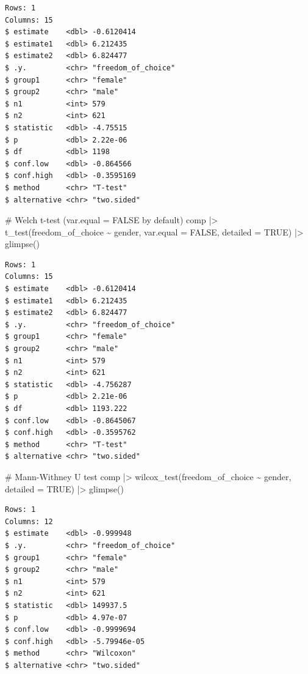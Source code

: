 \documentclass[
  letterpaper,
]{krantz}
\makeatletter
\newenvironment{Shaded}{\begin{snugshade}}{\end{snugshade}}
\newcommand{\AttributeTok}[1]{\textcolor[rgb]{0.40,0.45,0.13}{#1}}
\newcommand{\CommentTok}[1]{\textcolor[rgb]{0.37,0.37,0.37}{#1}}
\newcommand{\ConstantTok}[1]{\textcolor[rgb]{0.56,0.35,0.01}{#1}}
\newcommand{\FunctionTok}[1]{\textcolor[rgb]{0.28,0.35,0.67}{#1}}
\newcommand{\NormalTok}[1]{\textcolor[rgb]{0.00,0.23,0.31}{#1}}
\newcommand{\SpecialCharTok}[1]{\textcolor[rgb]{0.37,0.37,0.37}{#1}}
\newenvironment{kframe}{%
\medskip{}
\setlength{\fboxsep}{.8em}
 \def\at@end@of@kframe{}%
 \ifinner\ifhmode%
  \def\at@end@of@kframe{\end{minipage}}%
  \begin{minipage}{\columnwidth}%
 \fi\fi%
 \def\FrameCommand##1{\hskip\@totalleftmargin \hskip-\fboxsep
 \colorbox{shadecolor}{##1}\hskip-\fboxsep
     \hskip-\linewidth \hskip-\@totalleftmargin \hskip\columnwidth}%
 \MakeFramed {\advance\hsize-\width
   \@totalleftmargin\z@ \linewidth\hsize
   \@setminipage}}%
 {\par\unskip\endMakeFramed%
 \at@end@of@kframe}
\renewenvironment{Shaded}{\begin{kframe}}{\end{kframe}}
\makeatother
\begin{document}
\begin{verbatim}
Rows: 1
Columns: 15
$ estimate    <dbl> -0.6120414
$ estimate1   <dbl> 6.212435
$ estimate2   <dbl> 6.824477
$ .y.         <chr> "freedom_of_choice"
$ group1      <chr> "female"
$ group2      <chr> "male"
$ n1          <int> 579
$ n2          <int> 621
$ statistic   <dbl> -4.75515
$ p           <dbl> 2.22e-06
$ df          <dbl> 1198
$ conf.low    <dbl> -0.864566
$ conf.high   <dbl> -0.3595169
$ method      <chr> "T-test"
$ alternative <chr> "two.sided"
\end{verbatim}

\begin{Shaded}
\begin{Highlighting}[]
\CommentTok{\# Welch t{-}test (var.equal = FALSE by default)}
\NormalTok{comp }\SpecialCharTok{|\textgreater{}} \FunctionTok{t\_test}\NormalTok{(freedom\_of\_choice }\SpecialCharTok{\textasciitilde{}}\NormalTok{ gender,}
                \AttributeTok{var.equal =} \ConstantTok{FALSE}\NormalTok{,}
                \AttributeTok{detailed =} \ConstantTok{TRUE}\NormalTok{) }\SpecialCharTok{|\textgreater{}}
  \FunctionTok{glimpse}\NormalTok{()}
\end{Highlighting}
\end{Shaded}

\begin{verbatim}
Rows: 1
Columns: 15
$ estimate    <dbl> -0.6120414
$ estimate1   <dbl> 6.212435
$ estimate2   <dbl> 6.824477
$ .y.         <chr> "freedom_of_choice"
$ group1      <chr> "female"
$ group2      <chr> "male"
$ n1          <int> 579
$ n2          <int> 621
$ statistic   <dbl> -4.756287
$ p           <dbl> 2.21e-06
$ df          <dbl> 1193.222
$ conf.low    <dbl> -0.8645067
$ conf.high   <dbl> -0.3595762
$ method      <chr> "T-test"
$ alternative <chr> "two.sided"
\end{verbatim}

\begin{Shaded}
\begin{Highlighting}[]
\CommentTok{\# Mann{-}Withney U test}
\NormalTok{comp }\SpecialCharTok{|\textgreater{}}
  \FunctionTok{wilcox\_test}\NormalTok{(freedom\_of\_choice }\SpecialCharTok{\textasciitilde{}}\NormalTok{ gender,}
              \AttributeTok{detailed =} \ConstantTok{TRUE}\NormalTok{) }\SpecialCharTok{|\textgreater{}}
  \FunctionTok{glimpse}\NormalTok{()}
\end{Highlighting}
\end{Shaded}

\begin{verbatim}
Rows: 1
Columns: 12
$ estimate    <dbl> -0.999948
$ .y.         <chr> "freedom_of_choice"
$ group1      <chr> "female"
$ group2      <chr> "male"
$ n1          <int> 579
$ n2          <int> 621
$ statistic   <dbl> 149937.5
$ p           <dbl> 4.97e-07
$ conf.low    <dbl> -0.9999694
$ conf.high   <dbl> -5.79946e-05
$ method      <chr> "Wilcoxon"
$ alternative <chr> "two.sided"
\end{verbatim}
\end{document}
